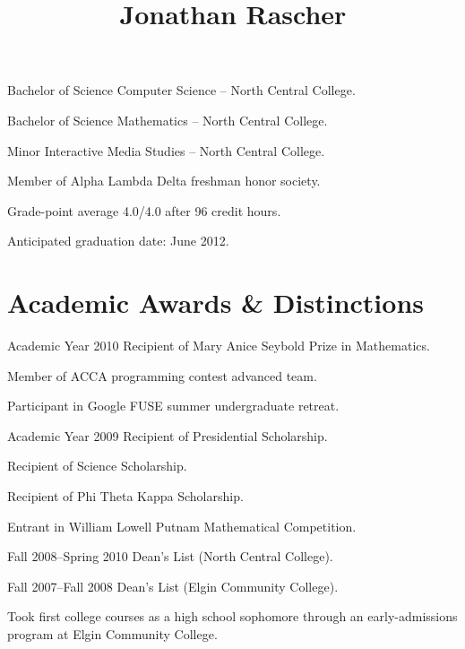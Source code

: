 \documentclass[11pt]{simplecv}
\begin{document}


  \title{Jonathan Rascher}
  \maketitle

  \begin{topic}
    \item[Bachelor of Science] Computer Science -- North Central College.

    \item[Bachelor of Science] Mathematics -- North Central College.

    \item[Minor] Interactive Media Studies -- North Central College.

    \item Member of Alpha Lambda Delta freshman honor society.

    \item Grade-point average 4.0/4.0 after 96 credit hours.

    \item Anticipated graduation date: June 2012.
  \end{topic}

  \section{Academic Awards \& Distinctions}
  \begin{topic}
    \item[Academic Year 2010] Recipient of Mary Anice Seybold Prize in Mathematics.

    Member of ACCA programming contest advanced team.

    Participant in Google FUSE summer undergraduate retreat.

    \item[Academic Year 2009] Recipient of Presidential Scholarship.

    Recipient of Science Scholarship.

    Recipient of Phi Theta Kappa Scholarship.

    Entrant in William Lowell Putnam Mathematical Competition.

    \item[Fall 2008--Spring 2010] Dean's List (North Central College).

    \item[Fall 2007--Fall 2008] Dean's List (Elgin Community College).

    \item Took first college courses as a high school sophomore through an early-admissions program at Elgin Community College.
  \end{topic}
\end{document}

